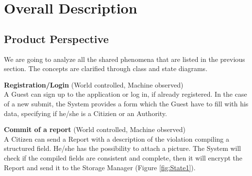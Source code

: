 \documentclass{report}
\begin{document}
\chapter{Overall Description}
\section{Product Perspective}
We are going to analyze all the shared phenomena that are listed in the previous section. The concepts are clarified through class and state diagrams.\\ \vspace{2mm}

\noindent\textbf{Registration/Login} (World controlled, Machine observed)\\
A Guest can sign up to the application or log in, if already registered. 
In the case of a new submit, the System provides a form which the Guest have to fill with his data, specifying if he/she is 
a Citizien or an Authority.\\ \vspace{2mm}

\noindent\textbf{Commit of a report} (World controlled, Machine observed)\\
A Citizen can send a Report with a description of the violation compiling a structured field. He/she has the possibility to  attach a picture. The System will check if the compiled fields are consistent and complete, then it will encrypt the Report and send it to the Storage Manager (Figure \ref{fig:State1}). \\ \vspace{2mm}
\end{document}
